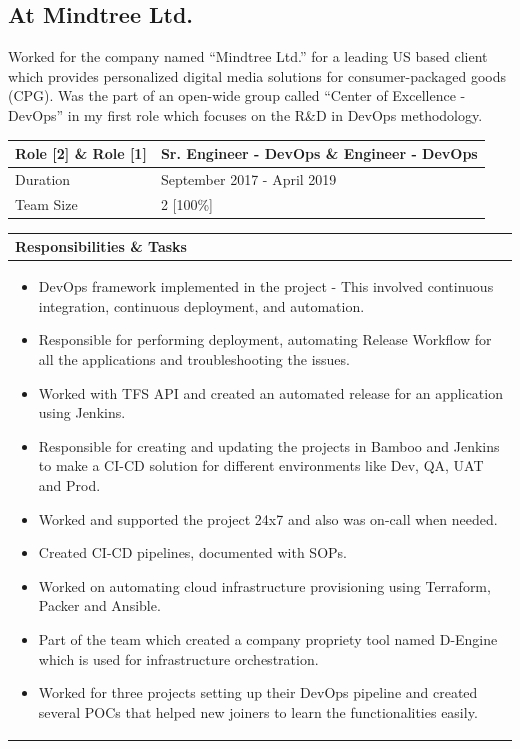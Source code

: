\documentclass[12pt, a4paper]{article}
\begin{document}
	\subsection*{At Mindtree Ltd.}
Worked for the company named “Mindtree Ltd.” for a leading US based client which provides personalized digital media solutions for consumer-packaged goods (CPG).  Was the part of an open-wide group called “Center of Excellence - DevOps” in my first role which focuses on the R\&D in DevOps methodology.\\

\noindent\begin{tabular}{|p{1.5in}|p{5.45in}|}
\hline
\rowcolor{black!20} Role [2] \& Role [1] & Sr.  Engineer - DevOps \& Engineer - DevOps\\
\hline
Duration & September 2017 - April 2019\\
\hline
Team Size & 2 [100\%]\\
\hline
\end{tabular}
\newline
\vspace*{1mm}
\newline
\begin{tabular}{|p{7.122in}|}
\hline
\rowcolor{black!5} Responsibilities \& Tasks\\
\hline
\begin{itemize}[noitemsep, nolistsep]
\item DevOps framework implemented in the project - This involved continuous integration, continuous deployment, and automation. 
\item Responsible for performing deployment, automating Release Workflow for all the applications and troubleshooting the issues. 
\item Worked with TFS API and created an automated release for an application using Jenkins. 
\item Responsible for creating and updating the projects in Bamboo and Jenkins to make a CI-CD solution for different environments like Dev, QA, UAT and Prod. 
\item Worked and supported the project 24x7 and also was on-call when needed. 
\item Created CI-CD pipelines, documented with SOPs.
\item Worked on automating cloud infrastructure provisioning using Terraform, Packer and Ansible.
\item Part of the team which created a company propriety tool named D-Engine which is used for infrastructure orchestration.
\item Worked for three projects setting up their DevOps pipeline and created several POCs that helped new joiners to learn the functionalities easily.
\end{itemize} \\
\hline
\end{tabular}
\pagebreak
\end{document}
